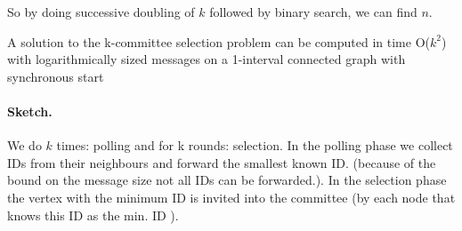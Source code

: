 So by doing successive doubling of $k$ followed by binary search, we can find $n$.

\begin{thm} A solution to the k-committee selection problem can be computed in time O($k^2$) with logarithmically sized messages on a 1-interval connected graph with synchronous start\end{thm}

\paragraph{Sketch.} We do $k$ times: polling and for k rounds: selection. In the polling phase we collect IDs from their neighbours and forward the smallest known ID. (because of the bound on the message size not all IDs can be forwarded.). In the selection phase the vertex with the minimum ID is invited into the committee (by each node that knows this ID as the min. ID	).
